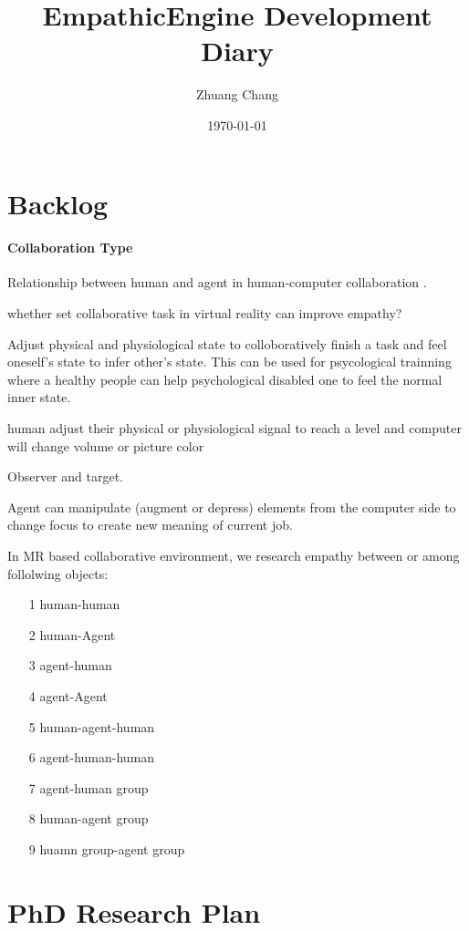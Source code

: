 \documentclass{article}
\begin{document}
\title{EmpathicEngine Development Diary}
\author{Zhuang Chang}
\date{\today}

\maketitle


\tableofcontents
\section{Backlog}
\paragraph{Collaboration Type}


Relationship between human and agent in human-computer collaboration \cite{EmpathyConcept}.

whether set collaborative task in virtual reality can improve empathy?

Adjust physical and physiological state to colloboratively finish a task and
feel oneself's state to infer other's state. This can be used for psycological 
trainning where a healthy people can help psychological disabled one to 
feel the normal inner state.


human adjust their physical or physiological signal to reach a level and computer
will change volume or picture color

Observer and target.

Agent can manipulate (augment or depress) elements from the computer side to 
change focus to create new meaning of current job.

In MR based collaborative environment, we research empathy between or among 
follolwing objects:
\begin{enumerate}
\item[1] human-human
\item[2] human-Agent
\item[3] agent-human
\item[4] agent-Agent
\item[5] human-agent-human
\item[6] agent-human-human
\item[7] agent-human group
\item[8] human-agent group
\item[9] huamn group-agent group     
\end{enumerate}


\section{PhD Research Plan}
\end{document}
